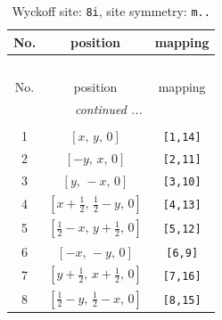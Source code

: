 \documentclass[fleqn,8pt]{jsarticle}
\begin{document}
\renewcommand{\arraystretch}{1.2}
\begin{longtable}{ccc}
\caption{Wyckoff site: {\tt 8i}, site symmetry: {\tt m..}}
 \\
 \hline \hline
No. & position & mapping \\ \hline \endfirsthead

\multicolumn{2}{l}{\tablename\ \thetable{}} \\
 \hline \hline
No. & position & mapping \\ \hline \endhead

 \hline \hline
\multicolumn{2}{r}{\footnotesize\it continued ...} \\ \endfoot

 \hline \hline
\multicolumn{2}{r}{} \\ \endlastfoot

1 & $\left[ x,\, y,\, 0 \right]$ & {\tt [1,14]} \\ \hline
2 & $\left[ - y,\, x,\, 0 \right]$ & {\tt [2,11]} \\ \hline
3 & $\left[ y,\, - x,\, 0 \right]$ & {\tt [3,10]} \\ \hline
4 & $\left[ x + \frac{1}{2},\, \frac{1}{2} - y,\, 0 \right]$ & {\tt [4,13]} \\ \hline
5 & $\left[ \frac{1}{2} - x,\, y + \frac{1}{2},\, 0 \right]$ & {\tt [5,12]} \\ \hline
6 & $\left[ - x,\, - y,\, 0 \right]$ & {\tt [6,9]} \\ \hline
7 & $\left[ y + \frac{1}{2},\, x + \frac{1}{2},\, 0 \right]$ & {\tt [7,16]} \\ \hline
8 & $\left[ \frac{1}{2} - y,\, \frac{1}{2} - x,\, 0 \right]$ & {\tt [8,15]} \\
\end{longtable}
\renewcommand{\arraystretch}{1.2}
\end{document}
